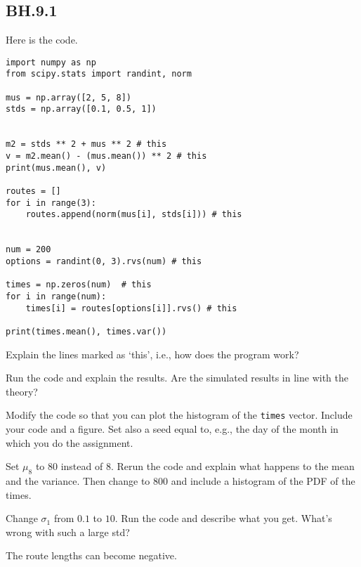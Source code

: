 \subsection{BH.9.1}
\label{sec:bh.9.1}

Here is the code.

\begin{verbatim}
import numpy as np
from scipy.stats import randint, norm

mus = np.array([2, 5, 8])
stds = np.array([0.1, 0.5, 1])


m2 = stds ** 2 + mus ** 2 # this
v = m2.mean() - (mus.mean()) ** 2 # this
print(mus.mean(), v)

routes = []
for i in range(3):
    routes.append(norm(mus[i], stds[i])) # this


num = 200
options = randint(0, 3).rvs(num) # this

times = np.zeros(num)  # this
for i in range(num):
    times[i] = routes[options[i]].rvs() # this

print(times.mean(), times.var())
\end{verbatim}

\begin{exercise}
Explain the lines marked as `this', i.e., how does the program work?
\end{exercise}

\begin{exercise}
Run the code and explain the results. Are the simulated results in line with the theory?
\end{exercise}

\begin{exercise}
Modify the code so that you can plot the histogram of the \verb|times| vector. Include your code and a figure. Set also a seed equal to, e.g.,  the day of the month in which you do the assignment.
\end{exercise}


\begin{exercise}
Set $\mu_8$ to 80 instead of $8$. Rerun the code and explain what happens to the mean and the variance. Then change to 800 and include a histogram of the PDF of the times.
\end{exercise}


\begin{exercise}
Change $\sigma_1$ from $0.1$ to $10$.  Run the code and describe what you get. What's wrong with such a large std?
\begin{solution}
The route lengths can become negative.
\end{solution}
\end{exercise}
